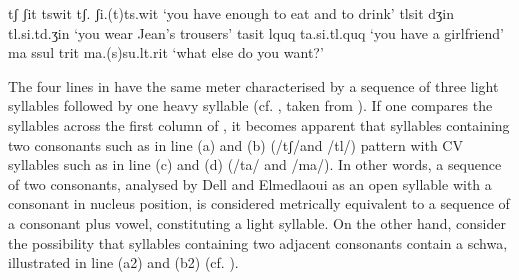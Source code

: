 \begin{exe}
\ex\label{ex:6:1} \begin{xlist}
                \ex\label{ex:6:1a} tʃ ʃit tswit \newline
                tʃ. ʃi.(t)ts.wit \newline
                ‘you have enough to eat and to drink’
                \ex\label{ex:6:1b} tlsit dʒin \newline 
				tl.si.td.ʒin \newline	
				‘you wear Jean’s trousers’
				\ex\label{ex:6:1c} tasit lquq  \newline 
				ta.si.tl.quq \newline	
				‘you have a girlfriend’
                \ex\label{ex:6:1d} ma ssul trit \newline 
				ma.(s)su.lt.rit \newline	
				‘what else do you want?’  
\end{xlist}
\end{exe} 

The four lines in  have the same meter characterised by a sequence of three light syllables followed by one heavy syllable (cf. , taken from \citealt{Ridouane2008}). If one compares the syllables across the first column of , it becomes apparent that syllables containing two consonants such as in line (a) and (b) (/tʃ/and /tl/) pattern with CV syllables such as in line (c) and (d) (/ta/ and /ma/). In other words, a sequence of two consonants, analysed by Dell and Elmedlaoui as an open syllable with a consonant in nucleus position, is considered metrically equivalent to a sequence of a consonant plus vowel, constituting a light syllable. On the other hand, consider the possibility that syllables containing two adjacent consonants contain a schwa, illustrated in line (a2) and (b2) (cf. ). 


